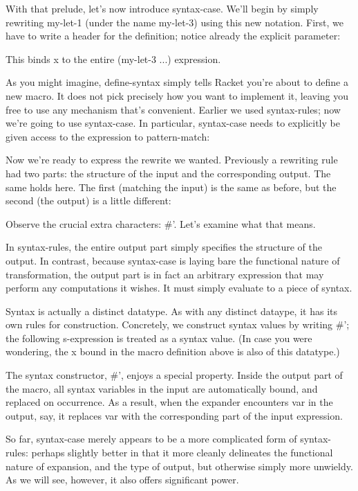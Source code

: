 With that prelude, let’s now introduce syntax-case. We’ll begin by simply
rewriting my-let-1 (under the name my-let-3) using this new notation. First, we
have to write a header for the definition; notice already the explicit
parameter:

This binds x to the entire (my-let-3 ...) expression.

As you might imagine, define-syntax simply tells Racket you’re about to define a
new macro. It does not pick precisely how you want to implement it, leaving you
free to use any mechanism that’s convenient. Earlier we used syntax-rules; now
we’re going to use syntax-case. In particular, syntax-case needs to explicitly
be given access to the expression to pattern-match:

Now we’re ready to express the rewrite we wanted. Previously a rewriting rule
had two parts: the structure of the input and the corresponding output. The same
holds here. The first (matching the input) is the same as before, but the second
(the output) is a little different:

Observe the crucial extra characters: \#'. Let’s examine what that means.

In syntax-rules, the entire output part simply specifies the structure of the
output. In contrast, because syntax-case is laying bare the functional nature of
transformation, the output part is in fact an arbitrary expression that may
perform any computations it wishes. It must simply evaluate to a piece of
syntax.

Syntax is actually a distinct datatype. As with any distinct dataype, it has its
own rules for construction. Concretely, we construct syntax values by writing
\#'; the following s-expression is treated as a syntax value. (In case you were
wondering, the x bound in the macro definition above is also of this datatype.)

The syntax constructor, \#', enjoys a special property. Inside the output part
of the macro, all syntax variables in the input are automatically bound, and
replaced on occurrence. As a result, when the expander encounters var in the
output, say, it replaces var with the corresponding part of the input expression.


So far, syntax-case merely appears to be a more complicated form of syntax-
rules: perhaps slightly better in that it more cleanly delineates the functional
nature of expansion, and the type of output, but otherwise simply more unwieldy.
As we will see, however, it also offers significant power.

